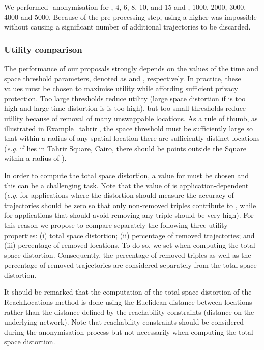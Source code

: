 We performed -anonymisation for , 4, 6, 8, 10, and
15 and , 1000, 2000, 3000, 4000 and 5000. Because of the
pre-processing step, using a higher  was impossible without
causing a
significant number of additional trajectories to be discarded.


\subsubsection{Utility comparison}

The performance of our proposals strongly depends on the values
of the time and space threshold parameters, denoted as 
and , respectively. In practice, these values must be chosen
to maximise utility
while affording sufficient privacy protection. Too large
thresholds reduce utility (large space distortion if  is too
high and large time distortion is  is too high),
but too small thresholds
reduce utility because of removal of many unswappable locations.
As a rule of thumb, as illustrated in Example~\ref{tahrir},
the space threshold  must be sufficiently large so that
within a radius  of any spatial location
there are sufficiently distinct locations ({\em e.g.}
if  lies in Tahrir Square, Cairo, there should
be points outside the Square within a radius  of ).

In order to compute the total space distortion, a value
for  must be chosen and this can be a challenging task.
Note that the value of  is application-dependent
({\em e.g.} for applications where the distortion should
measure the accuracy of trajectories
 should be zero so that only non-removed triples
contribute to , while for
applications that should avoid removing any triple
 should be very high).
For this reason we propose to compare separately the following three utility
properties: (i) total space distortion; (ii) percentage
of removed trajectories; and
(iii) percentage of removed locations. To do so, we set 
when computing the total space distortion. Consequently, the
percentage of removed triples as well as the percentage of removed
trajectories are considered separately from the total space distortion.

It should be remarked that the computation of the total space distortion
of the ReachLocations method is done using the Euclidean distance
between locations rather than the distance defined by the
reachability constraints (distance on the underlying network).
Note that reachability constraints should be considered during
the anonymisation process but not necessarily when computing
the total space distortion.

